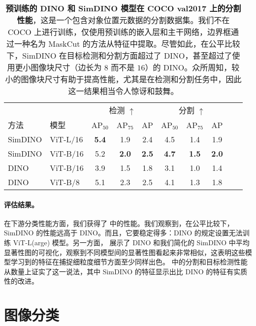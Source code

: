 \documentclass[../../book-main.tex]{subfiles}
\begin{document}
\begin{table}
    \centering 
    \begin{tabular}{@{}llcccccccc@{}}
        \toprule
         &  & \multicolumn{3}{c}{检测 $\uparrow$} &  \multicolumn{3}{c}{分割 $\uparrow$} \\ 
        方法 & 模型 & AP$_{50}$  & AP$_{75}$ & AP & AP$_{50}$ & AP$_{75}$ & AP  \\ 
        \midrule
        SimDINO &ViT-L/16 &\bf 5.4 &1.9 &2.4 &4.5 &1.4 &1.9 \\
        SimDINO &ViT-B/16 &5.2 & \bf 2.0 & \bf 2.5 & \bf4.7 & \bf 1.5 & \bf 2.0 \\
        DINO &ViT-B/16 &3.9 &1.5 &1.8 &3.1 &1.0 &1.4 \\
        \midrule
        \color{gray} DINO & \color{gray} ViT-B/8 & \color{gray}5.1 & \color{gray}2.3 & \color{gray}2.5 & \color{gray}4.1 & \color{gray}1.3 & \color{gray}1.8 \\
        \bottomrule
    \end{tabular}
    \caption{\small\textbf{预训练的 DINO 和 SimDINO 模型在 COCO val2017 \citep{lin2014microsoft} 上的分割性能}，这是一个包含对象位置元数据的分割数据集。我们不在 COCO 上进行训练，仅使用预训练的嵌入层和主干网络，边界框通过一种名为 MaskCut \citep{wang2023cut} 的方法从特征中提取。尽管如此，在公平比较下，SimDINO 在目标检测和分割方面超过了 DINO，甚至超过了使用更小图像块尺寸（边长为 \(8\) 而不是 \(16\)）的 DINO。众所周知，较小的图像块尺寸有助于提高性能，尤其是在检测和分割任务中，因此这一结果相当令人惊讶和鼓舞。}
    \label{tab:dino_segmentation}
\end{table}

\paragraph{评估结果。} 在下游分类性能方面，我们获得了  中的性能。我们观察到，在公平比较下，SimDINO 的性能远高于 DINO。而且，它要稳定得多：DINO 的规定设置无法训练 ViT-L(arge) 模型。另一方面， 展示了 DINO 和我们简化的 SimDINO 中平均显著性图的可视化，观察到不同模型间的显著性图看起来非常相似，这表明这些模型学习到的特征在捕捉细粒度细节方面至少同样出色。 中的分割和目标检测性能从数量上证实了这一说法，其中 SimDINO 的特征显示出比 DINO 的特征有实质性的改进。



\section{图像分类}
\end{document}

